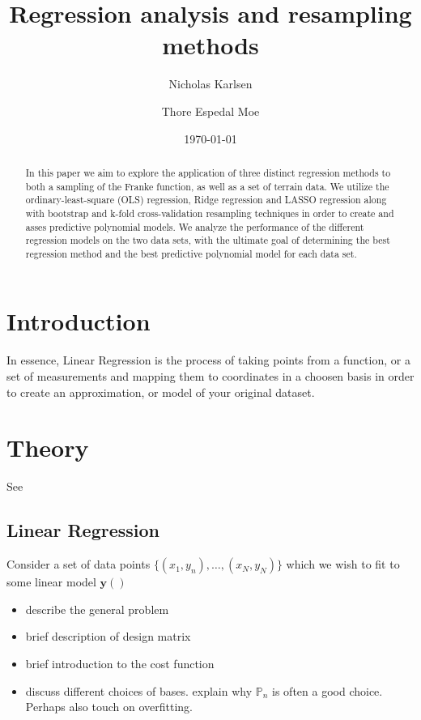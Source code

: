 \documentclass[reprint, english, nofootinbib]{revtex4-2}
\begin{document}
\title{Regression analysis and resampling methods}
\author{Nicholas Karlsen}
\author{Thore Espedal Moe}
\date{\today}

\begin{abstract}
   In this paper we aim to explore the application of three distinct regression methods to both a sampling of the Franke function, as well as a set of terrain data. We utilize the ordinary-least-square (OLS) regression, Ridge regression and LASSO regression along with bootstrap and k-fold cross-validation resampling techniques in order to create and asses predictive polynomial models. We analyze the performance of the different regression models on the two data sets, with the ultimate goal of determining the best regression method and the best predictive polynomial model for each data set.
\end{abstract}

\maketitle

\section{Introduction}
    \noindent
    In essence, Linear Regression is the process of taking points from a function, or a set of measurements and mapping them to coordinates in a choosen basis in order to create an approximation, or model of your original dataset.
\section{Theory}
    See \textcite{hastie}
    \subsection{Linear Regression}
        Consider a set of data points $\{(x_1, y_n), \dots, (x_N, y_N)\}$ which we wish to fit to some linear model $\mathbf y()$
        \begin{itemize}
            \item describe the general problem
            \item brief description of design matrix
            \item brief introduction to the cost function
            \item discuss different choices of bases. explain why $\mathbb P_n$ is often a good choice. Perhaps also touch on overfitting.
        \end{itemize}
\end{document}
